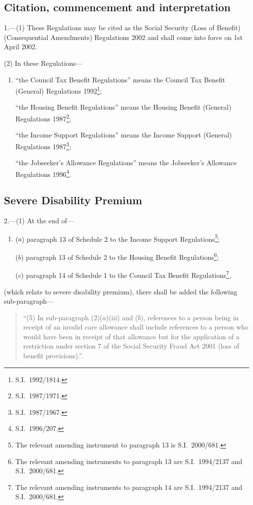 \documentclass[12pt,a4paper]{article}
\begin{document}
{\sloppy

\tableofcontents

}

\bigskip

\setcounter{secnumdepth}{-2}

\subsection[1. Citation, commencement and interpretation]{Citation, commencement and interpretation}

1.---(1)  These Regulations may be cited as the Social Security (Loss of Benefit) (Consequential Amendments) Regulations 2002 and shall come into force on 1st April 2002.

(2) In these Regulations—
\begin{enumerate}\item[]
“the Council Tax Benefit Regulations” means the Council Tax Benefit (General) Regulations 1992\footnote{S.I.\ 1992/1814.};

“the Housing Benefit Regulations” means the Housing Benefit (General) Regulations 1987\footnote{S.I.\ 1987/1971.};

“the Income Support Regulations” means the Income Support (General) Regulations 1987\footnote{S.I.\ 1987/1967.};

“the Jobseeker’s Allowance Regulations” means the Jobseeker’s Allowance Regulations 1996\footnote{S.I.\ 1996/207.}.
\end{enumerate}

\subsection[2. Severe Disability Premium]{Severe Disability Premium}

2.---(1)  At the end of—
\begin{enumerate}\item[]
($a$) paragraph 13 of Schedule 2 to the Income Support Regulations\footnote{The relevant amending instrument to paragraph 13 is S.I.\ 2000/681.};

($b$) paragraph 13 of Schedule 2 to the Housing Benefit Regulations\footnote{The relevant amending instruments to paragraph 13 are S.I.\ 1994/2137 and S.I.\ 2000/681.};

($c$) paragraph 14 of Schedule 1 to the Council Tax Benefit Regulations\footnote{The relevant amending instruments to paragraph 14 are S.I.\ 1994/2137 and S.I.\ 2000/681.},
\end{enumerate}
(which relate to severe disability premium), there shall be added the following sub-paragraph—
\begin{quotation}
“(5) In sub-paragraph (2)($a$)(iii) and ($b$), references to a person being in receipt of an invalid care allowance shall include references to a person who would have been in receipt of that allowance but for the application of a restriction under section 7 of the Social Security Fraud Act 2001 (loss of benefit provisions).”.
\end{quotation}
\end{document}
